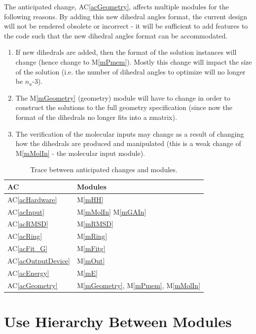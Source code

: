 \documentclass[12pt, titlepage]{article}
\newcommand{\acref}[1]{AC\ref{#1}}
\newcommand{\mref}[1]{M\ref{#1}}
\begin{document}
The anticipated change, \acref{acGeometry}, affects multiple modules for the 
following reasons. By adding this new dihedral angles format, the current 
design will not be rendered obsolete or incorrect - it will be sufficient to 
add features to the code such that the new dihedral angles format can be 
accommodated.
\begin{enumerate}
	\item If new dihedrals are added, then the format of the solution instances 
	will change (hence change to \mref{mPmem}). Mostly this change will impact 
	the size of the solution (i.e. the number of dihedral angles to optimize 
	will no longer be $n_a$-3).
	\item The \mref{mGeometry} (geometry) module will have to change in order 
	to construct the solutions to the full geometry specification (since now 
	the format of the dihedrals no longer fits into a zmatrix).
	\item The verification of the molecular inputs may change as a result of 
	changing how the dihedrals are produced and manipulated (this is a weak 
	change of \mref{mMolIn} - the molecular input module).
\end{enumerate}

\begin{table}[H]
\centering
\begin{tabular}{p{} p{}}
\toprule
\textbf{AC} & \textbf{Modules}\\
\midrule
\acref{acHardware} & \mref{mHH}\\
\acref{acInput} & \mref{mMolIn} \mref{mGAIn} \\
\acref{acRMSD} & \mref{mRMSD} \\
\acref{acRing} & \mref{mRing} \\
\acref{acFit_G} & \mref{mFitg} \\
\acref{acOutputDevice} & \mref{mOut} \\
\acref{acEnergy} & \mref{mE} \\
\acref{acGeometry} & \mref{mGeometry}, \mref{mPmem}, \mref{mMolIn} \\
\bottomrule
\end{tabular}
\caption{Trace between anticipated changes and modules.}
\label{trace-ACM}
\end{table}

\section{Use Hierarchy Between Modules} \label{SecUse}
\end{document}
